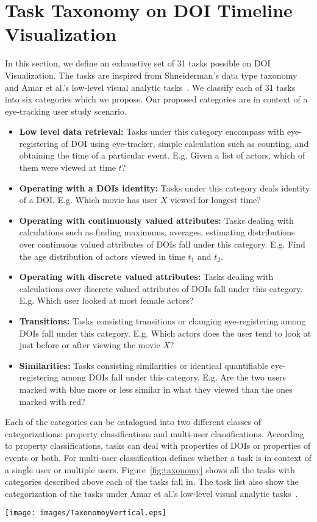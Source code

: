 \section{Task Taxonomy on DOI Timeline Visualization}

In this section, we define an exhaustive set of 31 tasks possible on  DOI Visualization. The tasks are inspired from Shneiderman's data type taxonomy~\cite{shneiderman1996eyes} and Amar et al.'s low-level visual analytic tasks~\cite{amar2005low}. We classify each of 31 tasks into six categories which we propose. Our proposed categories are in context of a eye-tracking user study scenario. 
\begin{itemize}
	\item \textbf{Low level data retrieval:} Tasks under this category encompass with eye-registering of DOI using eye-tracker, simple calculation such as counting, and obtaining the time of a particular event. E.g. Given a list of actors, which of them were viewed at time $t$?
	\item \textbf{Operating with a DOIs identity:} Tasks under this category deals identity of a DOI. E.g. Which movie has user $X$ viewed for longest time?
	\item \textbf{Operating with continuously valued attributes:} Tasks dealing with calculations such as finding maximums, averages, estimating distributions over continuous valued attributes of DOIs fall under this category. E.g. Find the age distribution of actors viewed in time $t_1$ and $t_2$.
	\item \textbf{Operating with discrete valued attributes:} Tasks dealing with calculations  over discrete valued attributes of DOIs fall under this category. E.g. Which user looked at most female actors?
	\item \textbf{Transitions:} Tasks consisting transitions or changing eye-registering among DOIs fall under this category. E.g. Which actors  does the user tend to look at just before or after  viewing the movie $X$?
	\item \textbf{Similarities:} Tasks consisting similarities or identical quantifiable eye-registering among DOIs fall under this category. E.g. Are the two users marked with blue more or less similar in what they viewed than the ones marked with red?
\end{itemize} 
 Each of the categories can be catalogued into two different classes of categorizations: property classifications and multi-user classifications. According to property classifications, tasks can deal with properties of DOIs or properties of events or both. For multi-user classification defines whether a task is in context of a single user or multiple users. Figure~\ref{fig:taxonomy} shows all the tasks with categories described above each of the tasks fall in. The task list also show the categorization of the tasks under Amar et al.'s low-level visual analytic tasks~\cite{amar2005low}.

\begin{figure*}[!htb]
  \centering
  \texttt{[image: images/TaxonomoyVertical.eps]}
  \caption{\label{fig:taxonomy}%
           31 task taxonomy list for DOI-based analysis. }
\end{figure*}